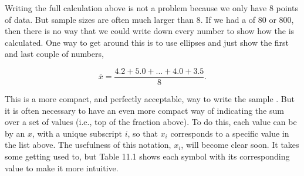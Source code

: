 \documentclass[
  openany]{krantz}
\begin{document}
Writing the full calculation above is not a problem because we only have 8 points of data.
But sample sizes are often much larger than 8.
If we had a  of 80 or 800, then there is no way that we could write down every number to show how the  is calculated.
One way to get around this is to use ellipses and just show the first and last couple of numbers,

\[\bar{x} = \frac{4.2 + 5.0 + ... + 4.0 + 3.5}{8}.\]

This is a more compact, and perfectly acceptable, way to write the sample .
But it is often necessary to have an even more compact way of indicating the sum over a set of values (i.e., top of the fraction above).
To do this, each value can be  by an \(x\), with a unique subscript \(i\), so that \(x_{i}\) corresponds to a specific value in the list above.
The usefulness of this notation, \(x_{i}\), will become clear soon.
It takes some getting used to, but Table 11.1 shows each symbol with its corresponding value to make it more intuitive.
\end{document}
